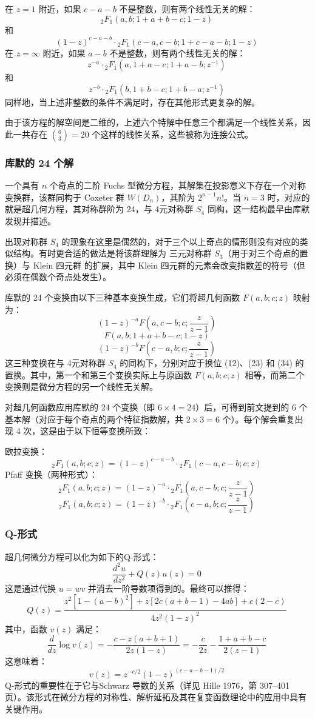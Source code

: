 在 $z = 1$ 附近，如果 $c - a - b$ 不是整数，则有两个线性无关的解：
$$
{}_2F_1(a, b; 1 + a + b - c; 1 - z)~
$$
和
$$
(1 - z)^{c - a - b} \cdot {}_2F_1(c - a, c - b; 1 + c - a - b; 1 - z)~
$$
在 $z = \infty$ 附近，如果 $a - b$ 不是整数，则有两个线性无关的解：
$$
z^{-a} \cdot {}_2F_1\left(a, 1 + a - c; 1 + a - b; z^{-1}\right)~
$$
和
$$
z^{-b} \cdot {}_2F_1\left(b, 1 + b - c; 1 + b - a; z^{-1}\right)~
$$
同样地，当上述非整数的条件不满足时，存在其他形式更复杂的解。

由于该方程的解空间是二维的，上述六个特解中任意三个都满足一个线性关系，因此一共存在 $\binom{6}{3} = 20$ 个这样的线性关系，这些被称为连接公式。
\subsubsection{库默的 24 个解}
一个具有 $n$ 个奇点的二阶 Fuchs 型微分方程，其解集在投影意义下存在一个对称变换群，该群同构于 Coxeter 群 $W(D_n)$，其阶为 $2^{n-1} n!$。当 $n = 3$ 时，对应的就是超几何方程，其对称群阶为 24，与 4元对称群 $S_4$ 同构，这一结构最早由库默发现并描述。

出现对称群 $S_4$ 的现象在这里是偶然的，对于三个以上奇点的情形则没有对应的类似结构。有时更合适的做法是将该群理解为 三元对称群 $S_3$（用于对三个奇点的置换）与 Klein 四元群 的扩展，其中 Klein 四元群的元素会改变指数差的符号（但必须在偶数个奇点处发生）。

库默的 24 个变换由以下三种基本变换生成，它们将超几何函数 $F(a, b; c; z)$ 映射为：
$$
(1 - z)^{-a} F\left(a, c - b; c; \frac{z}{z - 1}\right)~
$$
$$
F\left(a, b; 1 + a + b - c; 1 - z\right)~
$$
$$
(1 - z)^{-b} F\left(c - a, b; c; \frac{z}{z - 1}\right)~
$$
这三种变换在与 4元对称群 $S_4$ 的同构下，分别对应于换位 (12)、(23) 和 (34) 的置换。其中，第一个和第三个变换实际上与原函数 $F(a, b; c; z)$ 相等，而第二个变换则是微分方程的另一个线性无关解。

对超几何函数应用库默的 24 个变换（即 $6 \times 4 = 24$）后，可得到前文提到的 6 个基本解（对应于每个奇点的两个特征指数解，共 $2 \times 3 = 6$ 个）。每个解会重复出现 4 次，这是由于以下恒等变换所致：

欧拉变换：
  $$
  {}_2F_1(a, b; c; z) = (1 - z)^{c - a - b} \cdot {}_2F_1(c - a, c - b; c; z)~
  $$
Pfaff 变换（两种形式）：
  $$
  {}_2F_1(a, b; c; z) = (1 - z)^{-a} \cdot {}_2F_1\left(a, c - b; c; \frac{z}{z - 1}\right)~
  $$
  $$
  {}_2F_1(a, b; c; z) = (1 - z)^{-b} \cdot {}_2F_1\left(c - a, b; c; \frac{z}{z - 1}\right)~
  $$
\subsubsection{Q-形式}
超几何微分方程可以化为如下的Q-形式：
$$
\frac{d^2 u}{dz^2} + Q(z) u(z) = 0~
$$
这是通过代换 $u = wv$ 并消去一阶导数项得到的。最终可以推得：
$$
Q(z) = \frac{
z^2[1 - (a - b)^2] + z[2c(a + b - 1) - 4ab] + c(2 - c)
}{
4z^2(1 - z)^2
}~
$$
其中，函数 $v(z)$ 满足：
$$
\frac{d}{dz} \log v(z) = -\frac{c - z(a + b + 1)}{2z(1 - z)} = -\frac{c}{2z} - \frac{1 + a + b - c}{2(z - 1)}~
$$
这意味着：
$$
v(z) = z^{-c/2} (1 - z)^{(c - a - b - 1)/2}~
$$
Q-形式的重要性在于它与Schwarz 导数的关系（详见 Hille 1976，第 307–401 页）。该形式在微分方程的对称性、解析延拓及其在复变函数理论中的应用中具有关键作用。
